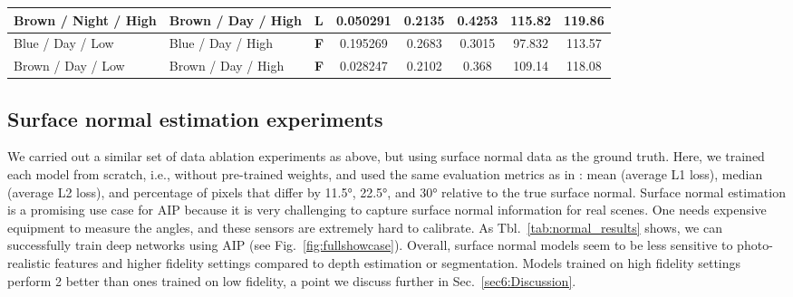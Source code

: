 \documentclass[runningheads]{llncs}
\begin{document}
\begin{table}[t]
{\begin{tabular}{|l|l|c|c|c|c|c|c|}
Brown / Night / High         & Brown / Day / High       & \textbf{L}                         & 0.050291                         & 0.2135                           & 0.4253                           & 115.82                             & 119.86                               \\ \hline
Blue / Day / Low             & Blue / Day / High        & \textbf{F}                         & 0.195269                         & 0.2683                           & 0.3015                           & 97.832                             & 113.57                               \\ \hline
Brown / Day / Low            & Brown / Day / High       & \textbf{F}                         & 0.028247                         & 0.2102                           & 0.368                            & 109.14                             & 118.08                               \\ \hline
\end{tabular}}
\vspace{-1em}
\end{table}


\vspace{-0.5em}
\subsection{Surface normal estimation experiments}
We carried out a similar set of data ablation experiments as above, but using surface normal data as the ground truth. Here, we trained each model from scratch, i.e., without pre-trained weights, and used the same evaluation metrics as in \cite{DBLP:journals/corr/abs-1904-03405_normal}: mean (average L1 loss), median (average L2 loss), and percentage of pixels that differ by \ang{11.5}, \ang{22.5}, and \ang{30} relative to the true surface normal. Surface normal estimation is a promising use case for AIP because it is very challenging to capture surface normal information for real scenes. One needs expensive equipment to measure the angles, and these sensors are extremely hard to calibrate. As Tbl.~\ref{tab:normal_results} shows, we can successfully train deep networks using AIP (see Fig.~\ref{fig:fullshowcase}). Overall, surface normal models seem to be less sensitive to photo-realistic features and higher fidelity settings compared to depth estimation or segmentation. Models trained on high fidelity settings perform 2 better than ones trained on low fidelity, a point we discuss further in Sec.~\ref{sec6:Discussion}. 
\end{document}
